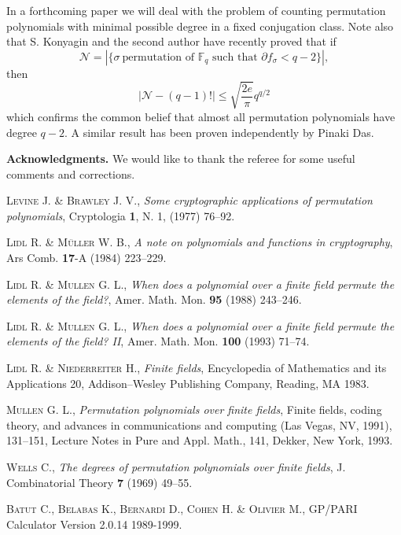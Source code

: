 \documentclass[10pt,a4paper,twoside]{article}
\def\Fq{{\mathbb{F}}_q}
\begin{document}
In a forthcoming paper we will deal with the problem of counting
permutation polynomials with
minimal possible degree in a fixed conjugation class. Note also that S. Konyagin and the
second author have recently proved that if
$$\mathcal N=\left|\{\sigma\ \textrm{permutation of $\Fq$ such that }
\partial f_\sigma<q-2\}\right|,$$
then
$$\left|\mathcal N -(q-1)!\right|\leq \sqrt{\frac{2e}{\pi}}q^{q/2}$$
which confirms the common belief that almost all permutation
polynomials have degree $q-2$. A similar result has been
proven independently by Pinaki Das.\bigskip

\noindent\textbf{Acknowledgments.}
We would like to thank the referee for some useful comments and corrections.

\begin{thebibliography}{99}

 \textsc{Levine J. \& Brawley J. V.},
\textit{Some cryptographic applications of permutation polynomials}, Cryptologia
\textbf{1}, N. 1, (1977)  76--92.

 \textsc{Lidl R. \& M\"uller W. B.}, \textit{A note on polynomials
and functions in cryptography}, Ars Comb. \textbf{17}-A (1984) 223--229.

 \textsc{Lidl R. \& Mullen G. L.},
\textit{When does a polynomial over a finite field permute the elements of the field?},
Amer. Math. Mon. \textbf{95} (1988) 243--246.

 \textsc{Lidl R. \& Mullen G. L.}, \textit{When does a polynomial
over a finite field permute the elements of the field? II}, Amer. Math. Mon.
\textbf{100} (1993) 71--74.

 \textsc{Lidl R. \& Niederreiter H.}, \textit{Finite fields}, Encyclopedia of Mathematics and its Applications 20, Addison--Wesley Publishing Company, Reading, MA 1983.


 \textsc{Mullen G. L.}, \textit{Permutation polynomials over finite fields},
 Finite fields, coding theory, and advances in communications and computing
(Las Vegas, NV, 1991), 131--151, Lecture Notes in Pure and Appl. Math., 141,
Dekker, New York, 1993.

 \textsc{Wells C.}, \textit{The degrees of permutation polynomials
over finite
fields}, J. Combinatorial Theory \textbf{7} (1969) 49--55.

 \textsc{Batut C.,  Belabas K., Bernardi D.,
Cohen H. \& Olivier M.}, GP/PARI Calculator Version 2.0.14
1989-1999.

\end{thebibliography}
\end{document}
